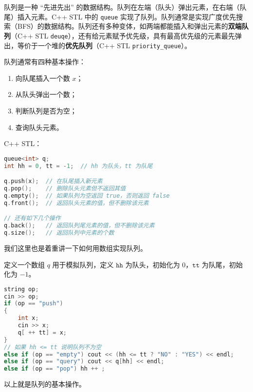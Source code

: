 
队列是一种 “先进先出” 的数据结构。队列在左端（队头）弹出元素，在右端（队尾）插入元素。C++ STL 中的 \verb|queue| 实现了队列。队列通常是实现广度优先搜索（BFS）的数据结构。队列还有多种变体，如两端都能插入和弹出元素的\textbf{双端队列}（C++ STL \verb|deuqe|），还有给元素赋予优先级，具有最高优先级的元素最先弹出，等价于一个堆的\textbf{优先队列}（C++ STL \verb|priority_queue|）。

队列通常有四种基本操作：

\begin{enumerate}
\item 向队尾插入一个数 $x$；
\item 从队头弹出一个数；
\item 判断队列是否为空；
\item 查询队头元素。
\end{enumerate}

C++ STL：

\begin{lstlisting}[language=cpp]
queue<int> q;
int hh = 0, tt = -1;  // hh 为队头，tt 为队尾

q.push(x);  // 在队尾插入新元素
q.pop();    // 删除队头元素但不返回其值
q.empty();  // 如果队列为空返回 true，否则返回 false
q.front();  // 返回队头元素的值，但不删除该元素

// 还有如下几个操作
q.back();   // 返回队列尾元素的值，但不删除该元素
q.size();   // 返回队列中元素的个数

\end{lstlisting}

我们这里也是着重讲一下如何用数组实现队列。

定义一个数组 $q$ 用于模拟队列，定义 $\mathtt{hh}$ 为队头，初始化为 $0$，$\mathtt{tt}$ 为队尾，初始化为 $-1$。

\begin{lstlisting}[language=cpp]
string op;
cin >> op;
if (op == "push") 
{
    int x;
    cin >> x;
    q[ ++ tt] = x;
} 
// 如果 hh <= tt 说明队列不为空
else if (op == "empty") cout << (hh <= tt ? "NO" : "YES") << endl;
else if (op == "query") cout << q[hh] << endl;
else if (op == "pop") hh ++ ;
\end{lstlisting}

以上就是队列的基本操作。

